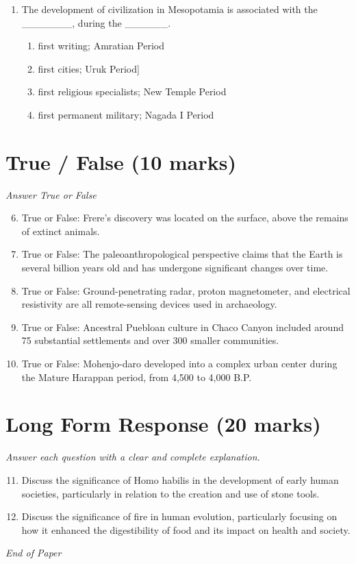 \documentclass[12pt]{article}
\begin{document}
\begin{enumerate}[label=\arabic*.]
\begin{enumerate}[label=(\alph*)]
    \item evolved into a more sophisticated technology.
\end{enumerate}
\item The development of civilization in Mesopotamia is associated with the \_\_\_\_\_\_\_, during the \_\_\_\_\_\_.
\begin{enumerate}[label=(\alph*)]
    \item first writing; Amratian Period
    \item first cities; Uruk Period]
    \item first religious specialists; New Temple Period
    \item first permanent military; Nagada I Period
\end{enumerate}
\end{enumerate}

\section*{True / False (10 marks)}
\textit{Answer True or False}
\begin{enumerate}[label=\arabic*.]
\setcounter{enumi}{5}
\item True or False: Frere's discovery was located on the surface, above the remains of extinct animals.
\item True or False: The paleoanthropological perspective claims that the Earth is several billion years old and has undergone significant changes over time.
\item True or False: Ground-penetrating radar, proton magnetometer, and electrical resistivity are all remote-sensing devices used in archaeology.
\item True or False: Ancestral Puebloan culture in Chaco Canyon included around 75 substantial settlements and over 300 smaller communities.
\item True or False: Mohenjo-daro developed into a complex urban center during the Mature Harappan period, from 4,500 to 4,000 B.P.
\end{enumerate}

\section*{Long Form Response (20 marks)}
\textit{Answer each question with a clear and complete explanation.}
\begin{enumerate}[label=\arabic*.]
\setcounter{enumi}{10}
\item Discuss the significance of Homo habilis in the development of early human societies, particularly in relation to the creation and use of stone tools.
\item Discuss the significance of fire in human evolution, particularly focusing on how it enhanced the digestibility of food and its impact on health and society.
\end{enumerate}

\vfill
\noindent\textit{End of Paper}
\end{document}
